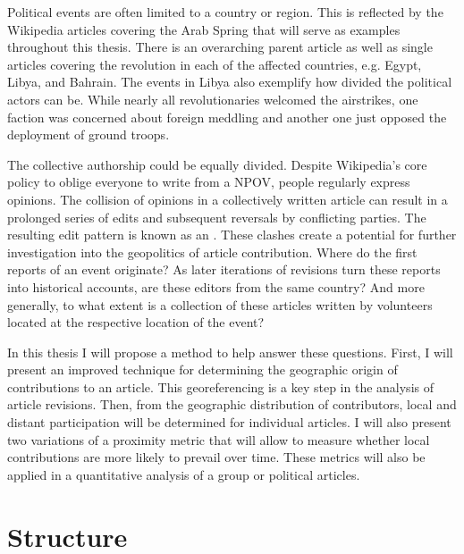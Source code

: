 Political events are often limited to a country or region. 
This is reflected by the Wikipedia articles covering the Arab Spring that will serve as examples throughout this thesis.
There is an overarching parent article  as well as single articles covering the revolution in each of the affected countries, e.g. Egypt, Libya, and Bahrain.
The events in Libya also exemplify how divided the political actors can be.
While nearly all revolutionaries welcomed the airstrikes, one faction was concerned about foreign meddling and another one just opposed the deployment of ground troops.\cite{econ18290470}

The collective authorship could be equally divided.
Despite Wikipedia's core policy to oblige everyone to write from a \ac{NPOV}, people regularly express opinions. 
The collision of opinions in a collectively written article can result in a prolonged series of edits and subsequent reversals by conflicting parties. 
The resulting edit pattern is known as an .\cite{suh2007us}
These clashes create a potential for further investigation into the geopolitics of article contribution.
Where do the first reports of an event originate?
As later iterations of revisions turn these reports into historical accounts, are these editors from the same country?
And more generally, to what extent is a collection of these articles written by volunteers located at the respective location of the event?

In this thesis I will propose a method to help answer these questions.
First, I will present an improved technique for determining the geographic origin of contributions to an article.
This georeferencing is a key step in the analysis of article revisions.
Then, from the geographic distribution of contributors, local and distant participation will be determined for individual articles.
I will also present two variations of a proximity metric that will allow to measure whether local contributions are more likely to prevail over time. 
These metrics will also be applied in a quantitative analysis of a group or political articles.

\section{Structure}

